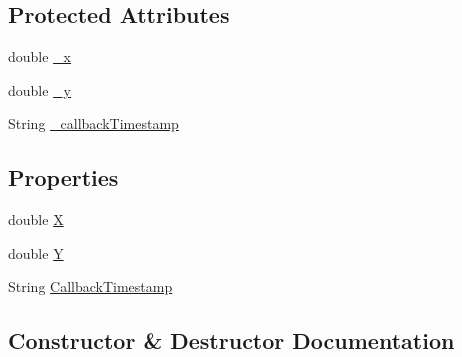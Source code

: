 \subsection*{Protected Attributes}
\begin{DoxyCompactItemize}
\item 
double \hyperlink{class_web_analyzer_1_1_models_1_1_base_1_1_base_tracking_data_a38d492dc01a8dbba23ec635874808081}{\+\_\+x}
\item 
double \hyperlink{class_web_analyzer_1_1_models_1_1_base_1_1_base_tracking_data_a435fc601a4a55e8ff46b1e42724cc269}{\+\_\+y}
\item 
String \hyperlink{class_web_analyzer_1_1_models_1_1_base_1_1_base_tracking_data_a97cfad26e3a27a528776bcccbe7da68d}{\+\_\+callback\+Timestamp}
\end{DoxyCompactItemize}
\subsection*{Properties}
\begin{DoxyCompactItemize}
\item 
double \hyperlink{class_web_analyzer_1_1_models_1_1_base_1_1_base_tracking_data_a579bb7898a92e60f4f26cf8a5cbfa46f}{X}
\item 
double \hyperlink{class_web_analyzer_1_1_models_1_1_base_1_1_base_tracking_data_ad885c1d6a4adb3f61a09b49d6e1550e7}{Y}
\item 
String \hyperlink{class_web_analyzer_1_1_models_1_1_base_1_1_base_tracking_data_a90e9e6a31ed34b1a7b0bdfa10566ef31}{Callback\+Timestamp}
\end{DoxyCompactItemize}


\subsection{Constructor \& Destructor Documentation}
\hypertarget{class_web_analyzer_1_1_models_1_1_base_1_1_base_tracking_data_a2963b17bffe021ad55b9f237f2df8b33}{}
